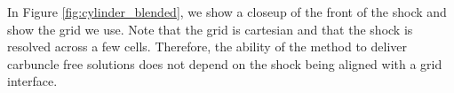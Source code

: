 \documentclass[preprint, 11pt]{article}
\begin{document}
In Figure \ref{fig:cylinder_blended}, we show a closeup of the front of the shock and show the grid we use.
Note that the grid is cartesian and that the shock is resolved across a few
cells. Therefore, the ability of the method to deliver
carbuncle free solutions does not depend on the shock being aligned with a grid interface. 

\begin{figure}[!h]
  {\scriptsize
    \quad ~~
}
\end{figure}
\end{document}
